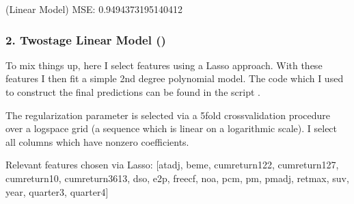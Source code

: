 \documentclass[letterpaper,10pt,english]{sphinxmanual}
\begin{document}
\begin{sphinxVerbatim}[commandchars=\\\{\}]
(Linear Model) MSE: 0.9494373195140412
\end{sphinxVerbatim}


\subsubsection{2. Two\sphinxhyphen{}stage Linear Model ()}
\label{\detokenize{stock_final:two-stage-linear-model-final-model}}
To mix things up, here I select features using a Lasso approach. With these features I then fit a simple 2nd degree polynomial model. The code which I used to construct the final predictions can be found in the script .


The regularization parameter is selected via a 5\sphinxhyphen{}fold cross\sphinxhyphen{}validation procedure over a logspace grid (a sequence which is linear on a logarithmic scale). I select all columns which have nonzero coefficients.

\begin{sphinxVerbatim}[commandchars=\\\{\}]
     
   

  \PYG{p}{[}  \PYG{p}{]}
\end{sphinxVerbatim}

\begin{sphinxVerbatim}[commandchars=\\\{\}]
Relevant features chosen via Lasso:
[\PYGZsq{}at\PYGZus{}adj\PYGZsq{}, \PYGZsq{}beme\PYGZsq{}, \PYGZsq{}cum\PYGZus{}return\PYGZus{}12\PYGZus{}2\PYGZsq{}, \PYGZsq{}cum\PYGZus{}return\PYGZus{}12\PYGZus{}7\PYGZsq{}, \PYGZsq{}cum\PYGZus{}return\PYGZus{}1\PYGZus{}0\PYGZsq{}, \PYGZsq{}cum\PYGZus{}return\PYGZus{}36\PYGZus{}13\PYGZsq{}, \PYGZsq{}d\PYGZus{}so\PYGZsq{}, \PYGZsq{}e2p\PYGZsq{}, \PYGZsq{}free\PYGZus{}cf\PYGZsq{}, \PYGZsq{}noa\PYGZsq{}, \PYGZsq{}pcm\PYGZsq{}, \PYGZsq{}pm\PYGZsq{}, \PYGZsq{}pm\PYGZus{}adj\PYGZsq{}, \PYGZsq{}ret\PYGZus{}max\PYGZsq{}, \PYGZsq{}suv\PYGZsq{}, \PYGZsq{}year\PYGZsq{}, \PYGZsq{}quarter3\PYGZsq{}, \PYGZsq{}quarter4\PYGZsq{}]
\end{sphinxVerbatim}
\end{document}
